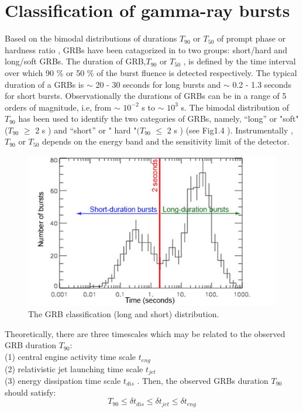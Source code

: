 \section{Classification of gamma-ray bursts}
Based on the bimodal distributions of durations $ T_{90}$ or $ T_{50}$ of prompt phase or hardness ratio , GRBs have been catagorized in to two groups: short/hard and long/soft GRBs. The duration of GRB,$ T_{90} $ or $ T_{50}$  , is defined by the time interval over which 90 \%  or  50 \%  of the burst fluence is detected respectively. The typical duration of a GRBs is $\sim $ 20 - 30  seconds for long bursts and $\sim $ 0.2 - 1.3 seconds for short bursts. Observationally the durations of GRBs can be in a range of 5 orders of magnitude, i.e, from $\sim $ $ 10^{-2} $ s  to $\sim $ $ 10^{3} $ s. The bimodal distribution of $ T_{90} $ has been used to identify the two categories of GRBs, namely, “long” or "soft" ($ T_{90}$ $\geqslant $ 2  s ) and “short” or " hard "$( T_{90}$   $\leqslant$ 2 s ) (see Fig1.4 ). Instrumentally ,  $T_{90}$  or  $T_{50} $ depends on the energy band and the sensitivity limit of the detector.
\begin{figure}[h]
\begin{center}
\includegraphics[scale=0.4]{Figures/fig4.png}
\caption{The GRB classification (long and short) distribution.}
\end{center}
\end{figure} 
Theoretically, there are three timescales which may be related to the observed GRB duration $ T_{90} $:\\
(1) central engine activity time scale $t_{eng}$\\
(2) relativistic jet launching time scale $t_{jet} $\\
(3) energy dissipation time scale $t_{dis}$ . Then, the observed GRBs duration $  T_{90}$ should satisfy: \citep{5}
\begin{equation}
T_{90} \leq \delta  t_{dis} \leq\delta t_{jet} \leq \delta t_{eng} 
\end{equation}

